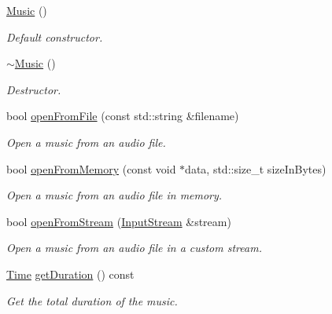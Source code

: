 \begin{DoxyCompactItemize}
\item 
\mbox{\label{classsf_1_1_music_a0bc787d8e022b3a9b89cf2c28befd42e}} 
\hyperlink{classsf_1_1_music_a0bc787d8e022b3a9b89cf2c28befd42e}{Music} ()
\begin{DoxyCompactList}\small\item\em Default constructor. \end{DoxyCompactList}\item 
\mbox{\label{classsf_1_1_music_a4c65860fed2f01d0eaa6c4199870414b}} 
\hyperlink{classsf_1_1_music_a4c65860fed2f01d0eaa6c4199870414b}{$\sim$\+Music} ()
\begin{DoxyCompactList}\small\item\em Destructor. \end{DoxyCompactList}\item 
bool \hyperlink{classsf_1_1_music_a3edc66e5f5b3f11e84b90eaec9c7d7c0}{open\+From\+File} (const std\+::string \&filename)
\begin{DoxyCompactList}\small\item\em Open a music from an audio file. \end{DoxyCompactList}\item 
bool \hyperlink{classsf_1_1_music_ae93b21bcf28ff0b5fec458039111386e}{open\+From\+Memory} (const void $\ast$data, std\+::size\+\_\+t size\+In\+Bytes)
\begin{DoxyCompactList}\small\item\em Open a music from an audio file in memory. \end{DoxyCompactList}\item 
bool \hyperlink{classsf_1_1_music_a4e55d1910a26858b44778c26b237d673}{open\+From\+Stream} (\hyperlink{classsf_1_1_input_stream}{Input\+Stream} \&stream)
\begin{DoxyCompactList}\small\item\em Open a music from an audio file in a custom stream. \end{DoxyCompactList}\item 
\hyperlink{classsf_1_1_time}{Time} \hyperlink{classsf_1_1_music_a288ef6f552a136b0e56952dcada3d672}{get\+Duration} () const
\begin{DoxyCompactList}\small\item\em Get the total duration of the music. \end{DoxyCompactList}\end{DoxyCompactItemize}
